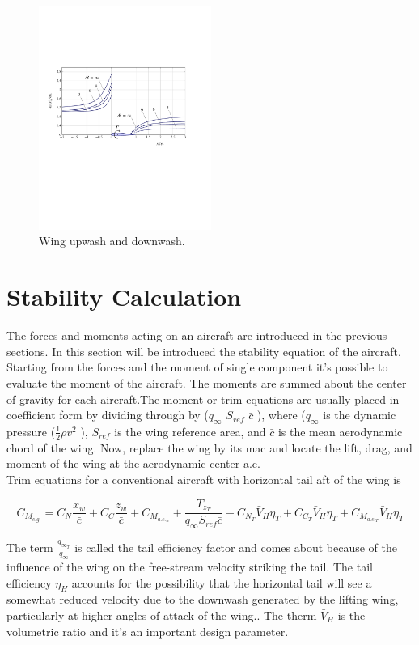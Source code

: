\begin{figure}[H]
\centering
\includegraphics[height=7.3cm]{Immagini/wing_up-downwash}
\caption{Wing upwash and downwash.}
\label{wingud}
\end{figure}



\section{Stability Calculation}

The forces and moments acting on an aircraft are introduced in the previous sections. In this section will be introduced the stability equation of the aircraft. Starting from the forces and the moment of single component it's possible to evaluate the moment of the aircraft. The moments are summed about the center of gravity for each aircraft.The moment or trim equations are usually placed in coefficient form by dividing through by ($q_{\infty}$ $S_{ref}$ $\bar{c}$ ), where ($q_{\infty}$ is the dynamic pressure ($\frac{1}{2} \rho v^2$ ), $S_{ref}$ is the wing reference area, and $\bar{c}$ is the mean aerodynamic chord of the wing. Now, replace the wing by its mac and locate the lift, drag, and moment of the wing at the aerodynamic center a.c.\\
Trim equations for a conventional aircraft with horizontal tail aft of the wing is

\begin{equation}
C_{M_{c.g.}} = C_N \frac{x_w}{\bar{c}} + C_C \frac{z_w}{\bar{c}} + C_{M_{a.c._{w}}} + \frac{T_{z_T}}{q_{\infty} S_{ref} \bar{c}} - C_{N_T} \bar{V}_H \eta_T + C_{C_T} \bar{V}_H \eta_T +  C_{M_{a.c._{T}}}\bar{V}_H \eta_T
\label{eqstabilitytrim}
\end{equation}

The term $\frac{q_{{\infty}_T}}{q_{\infty}}$ is called the tail efficiency factor and comes about because of the influence of the wing on the free-stream velocity striking the tail. The tail efficiency $\eta_H$ accounts for the possibility that the horizontal tail will see a somewhat reduced velocity due to the downwash generated by the lifting wing, particularly at higher angles of attack of the wing.\cite{sforza2014commercial}. The therm $\bar{V}_H$ is the volumetric ratio and it's an important design parameter. 
\noindent \\

